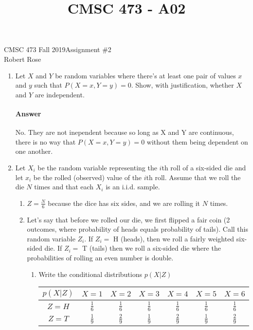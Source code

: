 \documentclass[12pt]{article}
\title{CMSC 473 - A02}
\begin{document}
CMSC 473 Fall 2019\hfill Assignment \#2\\
Robert Rose

\hrulefill

\begin{enumerate}
\item Let $X$ and $Y$ be random variables where there's at least one pair of values $x$ and $y$
      such that $P(X = x, Y = y) = 0$. Show, with justification, whether $X$ and $Y$ are independent.
    \paragraph{Answer} No. They are not inependent because so long as X and Y are continuous,
                there is no way that $P(X = x, Y = y) = 0$ without them being dependent on
                one another.
\item Let $X_i$ be the random variable representing the $i$th roll of a six-sided die
      and let $x_i$ be the rolled (observed) value of the $i$th roll. Assume that we
      roll the die $N$ times and that each $X_i$ is an i.i.d. sample.
  \begin{enumerate}
  \item $Z = \frac{N}{6}$ because the dice has six sides, and we are rolling it $N$ times.
  \item Let's say that before we rolled our die, we first flipped a fair coin (2 outcomes, where
        probability of heads equals probability of tails). Call this random variable $Z_i$. 
        If $Z_i =$ H (heads), then we roll a fairly weighted six-sided die. If $Z_i =$ T (tails)
        then we roll a six-sided die where the probabilities of rolling an even number is
        double.
        \begin{enumerate}
            \item Write the conditional distributions $p(X|Z)$
                \begin{center}
                \begin{tabular}{ |c|c|c|c|c|c|c| }
                    \hline
                    $p(X|Z)$ & $X = 1$ & $X = 2$ & $X = 3$ & $X = 4$ & $X = 5$ & $X = 6$ \\
                    \hline
                    $Z = H$ & $\frac{1}{6}$ & $\frac{1}{6}$ & $\frac{1}{6}$ & $\frac{1}{6}$ & $\frac{1}{6}$ & $\frac{1}{6}$ \\
                    \hline
                    $Z = T$ & $\frac{1}{9}$ & $\frac{2}{9}$ & $\frac{1}{9}$ & $\frac{2}{9}$ & $\frac{1}{9}$ & $\frac{2}{9}$ \\

\end{tabular}
\end{center}
\end{enumerate}
\end{enumerate}
\end{enumerate}
\end{document}
